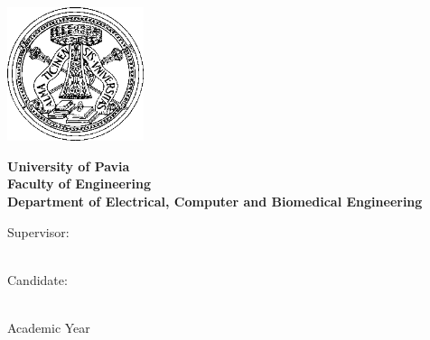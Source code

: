 \frenchspacing
\frontmatter


\begin{titlepage}

\thispagestyle{empty}

\begin{center}
\vskip 1cm
\includegraphics[width=4cm]{figs/Logo-unipv-bw}
\vskip 0.5cm

\LARGE
	\textbf{University of Pavia}\\
	\textbf{Faculty of Engineering}\\
	\textbf{Department of Electrical, Computer and Biomedical Engineering}

\vskip 0.5cm

\Large
	\printgraduation
	
\vskip 1.5cm

\Huge
	\textbf{\printtitle}

\vskip 1.5cm
	
\Large

\begin{minipage}[t]{7cm}
	Supervisor:\\
	\printsupervisor \\
\end{minipage}

\hfill

\begin{minipage}[t]{5cm}
	Candidate:\\
	\printauthor\\
\end{minipage}

\vskip 1.5cm

	Academic Year \printacademicyear

\end{center}

\vfill
\eject
\end{titlepage}
